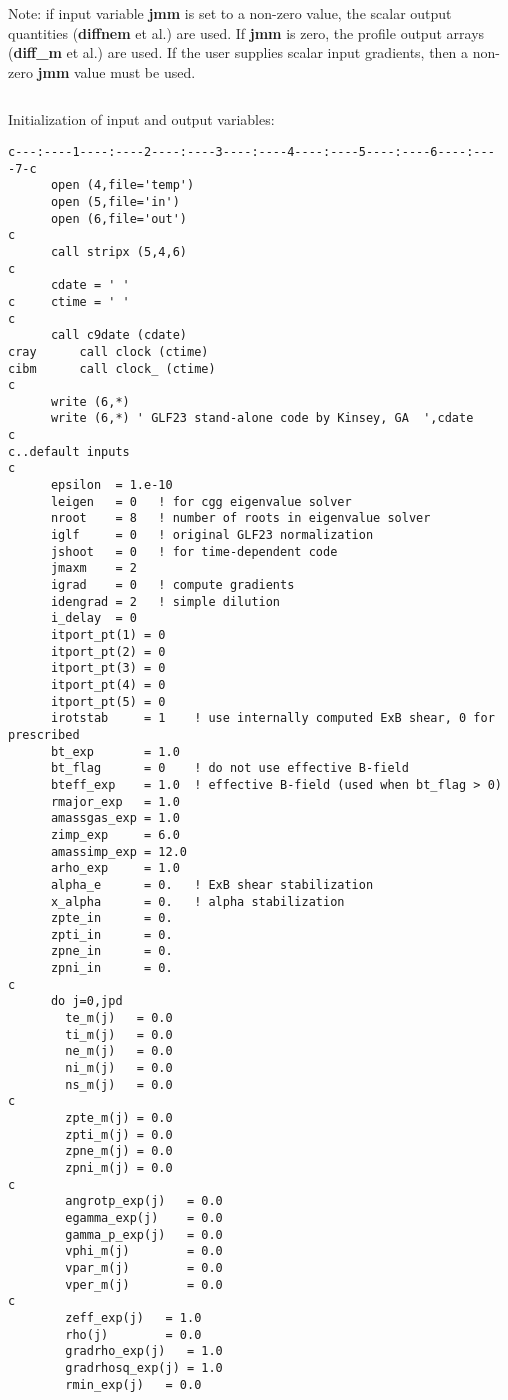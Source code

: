 \noindent
Note: if input variable {\bf jmm} is set to a non-zero value, the scalar 
output quantities ({\bf diffnem} et al.) are used.  If {\bf jmm} is zero,
the profile output arrays ({\bf diff\_m} et al.) are used.  If the user
supplies scalar input gradients, then a non-zero {\bf jmm} value must
be used.
\begin{verbatim}

\end{verbatim}

\noindent
\small
Initialization of input and output variables:
\begin{verbatim}
c---:----1----:----2----:----3----:----4----:----5----:----6----:----7-c
      open (4,file='temp')
      open (5,file='in')
      open (6,file='out')
c
      call stripx (5,4,6)
c
      cdate = ' '
c     ctime = ' '
c
      call c9date (cdate)
cray      call clock (ctime)
cibm      call clock_ (ctime)
c
      write (6,*)
      write (6,*) ' GLF23 stand-alone code by Kinsey, GA  ',cdate
c
c..default inputs
c
      epsilon  = 1.e-10
      leigen   = 0   ! for cgg eigenvalue solver
      nroot    = 8   ! number of roots in eigenvalue solver
      iglf     = 0   ! original GLF23 normalization
      jshoot   = 0   ! for time-dependent code
      jmaxm    = 2
      igrad    = 0   ! compute gradients
      idengrad = 2   ! simple dilution
      i_delay  = 0
      itport_pt(1) = 0
      itport_pt(2) = 0
      itport_pt(3) = 0
      itport_pt(4) = 0
      itport_pt(5) = 0
      irotstab     = 1    ! use internally computed ExB shear, 0 for prescribed
      bt_exp       = 1.0
      bt_flag      = 0    ! do not use effective B-field
      bteff_exp    = 1.0  ! effective B-field (used when bt_flag > 0)
      rmajor_exp   = 1.0
      amassgas_exp = 1.0
      zimp_exp     = 6.0
      amassimp_exp = 12.0
      arho_exp     = 1.0
      alpha_e      = 0.   ! ExB shear stabilization
      x_alpha      = 0.   ! alpha stabilization
      zpte_in      = 0.
      zpti_in      = 0.
      zpne_in      = 0.
      zpni_in      = 0.
c
      do j=0,jpd
        te_m(j)   = 0.0
        ti_m(j)   = 0.0
        ne_m(j)   = 0.0
        ni_m(j)   = 0.0
        ns_m(j)   = 0.0
c
        zpte_m(j) = 0.0
        zpti_m(j) = 0.0
        zpne_m(j) = 0.0
        zpni_m(j) = 0.0
c
        angrotp_exp(j)   = 0.0
        egamma_exp(j)    = 0.0
        gamma_p_exp(j)   = 0.0
        vphi_m(j)        = 0.0
        vpar_m(j)        = 0.0
        vper_m(j)        = 0.0
c
        zeff_exp(j)   = 1.0
        rho(j)        = 0.0
        gradrho_exp(j)   = 1.0
        gradrhosq_exp(j) = 1.0
        rmin_exp(j)   = 0.0

\end{verbatim}
